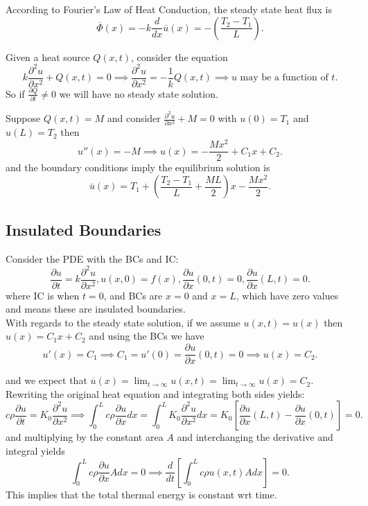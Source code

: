 \documentclass[class=article,crop=false]{standalone}
\begin{document}
\begin{eg}[continued]
According to Fourier's Law of Heat Conduction, the steady state heat flux is
\[
	\overline{\Phi}(x) = -k \frac{d }{d x} \overline{u}(x) = - \left( \frac{T_2-T_1}{L} \right)  
.\] 
\end{eg}

\begin{eg}[]
	Given a heat source $ Q(x,t)$, consider the equation
	 \[
		 k \frac{\partial^2 u}{\partial x^2} + Q(x,t) = 0 \implies \frac{\partial^2 u}{\partial {x}^2}= -\frac{1}{k} Q(x,t) \implies u \text{ may be a function of } t  
	.\] 
	So if $ \frac{\partial Q}{\partial t} \neq 0 $ we will have no steady state solution.
\end{eg}
\begin{eg}[]
	Suppose $ Q(x,t)=M$ and consider  $ \frac{\partial^2 u}{\partial {x}^2} +M=0 $ with $ u(0)=T_1$ and $ u(L)=T_2$ then 
	\[
		u''(x)=-M \implies u(x)=-\frac{Mx^2}{2}+C_1x+C_2
	.\] 
and the boundary conditions imply the equilibrium solution is
\[
	\overline{u}(x) = T_1 + \left( \frac{T_2-T_1}{L}+\frac{ML}{2} \right) x - \frac{Mx^2}{2}
.\] 
\end{eg}


\subsection{Insulated Boundaries}

Consider the PDE with the BCs and IC:
\[
	\frac{\partial u}{\partial t} =k \frac{\partial^2 u}{\partial {x}^2}, u(x,0)=f(x), \frac{\partial u}{\partial x} (0,t)=0, \frac{\partial u}{\partial x} (L,t)=0 
.\] 
where IC is when $ t=0$, and BCs are  $ x=0$ and  $ x=L$, which have zero values and means these are insulated boundaries. \\

With regards to the steady state solution, if we assume $ u(x,t)=u(x)$ then  $ u(x)=C_1 x + C_2$ and using the BCs we have
\[
	u'(x)=C_1 \implies C_1=u'(0)=\frac{\partial u}{\partial x} (0,t) =0 \implies u(x)=C_2
.\]

and we expect that $ \overline{u}(x) = \lim_{ t \to \infty} u(x,t) = \lim_{ t \to \infty} u(x)= C_2$. Rewriting the original heat equation and integrating both sides yields:
\[
	c\rho\frac{\partial u}{\partial t} =K_0 \frac{\partial^2 u}{\partial {x}^2} \implies \int_{0}^{L} c\rho \frac{\partial u}{\partial x} dx= \int_{0}^{L}  K_0 \frac{\partial^2 u}{\partial {x}^2} dx = K_0\left[ \frac{\partial u}{\partial x} (L,t) -\frac{\partial u}{\partial x} (0,t) \right] =0 
.\]
and multiplying by the constant area $ A$ and interchanging the derivative and integral yields
 \[
	 \int_{0}^{L} c\rho \frac{\partial u}{\partial x} A dx = 0 \implies \frac{d }{d t}  \left[  \int_{0}^{L}  c\rho u(x,t) A dx \right] =0 
.\] 
This implies that the total thermal energy is constant wrt time.
\end{document}
